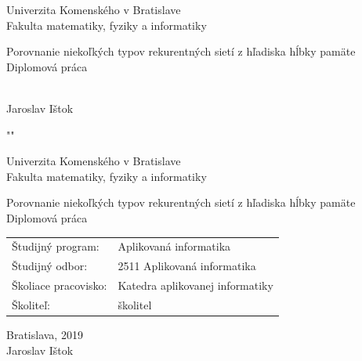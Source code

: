 \documentclass[12pt, oneside]{book}
\def\mfrok{2019}
\def\mfnazov{Porovnanie niekoľkých typov rekurentných sietí z hľadiska hĺbky pamäte}
\def\mftyp{Diplomová práca}
\def\mfautor{Jaroslav Ištok}
\def\mfskolitel{školitel}
\def\mfmiesto{Bratislava, \mfrok}
\def\mfodbor{2511  Aplikovaná informatika}
\def\program{ Aplikovaná informatika }
\def\mfpracovisko{ Katedra aplikovanej informatiky }
\begin{document}
     

\thispagestyle{empty}

\begin{center}
\sc\large
 Univerzita Komenského v Bratislave\\
 Fakulta matematiky, fyziky a informatiky
\vfill

{\LARGE\mfnazov}\\
\mftyp

\end{center}

\vfill

{\sc\large 
\noindent \mfrok\\
\mfautor
}

\eject %


\thispagestyle{empty}
\noindent
"" 
\begin{center}
\sc  
\large
 Univerzita Komenského v Bratislave\\
 Fakulta matematiky, fyziky a informatiky

\vfill

{\LARGE\mfnazov}\\
\mftyp
\end{center}

\vfill

\noindent
\begin{tabular}{ll}
Študijný program: & \program \\
Študijný odbor: & \mfodbor \\
Školiace pracovisko: & \mfpracovisko \\
Školiteľ: & \mfskolitel \\
\end{tabular}


\vfill


\noindent \mfmiesto\\
\mfautor

\eject %




\end{document}
